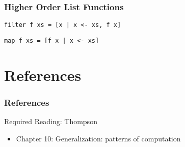 \documentclass[dvipsnames]{beamer}
\theoremstyle{plain}
\begin{document}
\begin{frame}[fragile]
  \frametitle{Higher Order List Functions}

  \begin{lstlisting}[deletekeywords={filter}]
filter f xs = [x | x <- xs, f x]
  \end{lstlisting}

  \begin{lstlisting}[deletekeywords={map}]
map f xs = [f x | x <- xs]
  \end{lstlisting}
\end{frame}

\section*{References}

\begin{frame}
  \frametitle{References}

  \begin{block}{Required Reading: Thompson}
    \begin{itemize}
      \item Chapter 10: \alert{Generalization: patterns of computation}
    \end{itemize}
  \end{block}
\end{frame}
\end{document}
